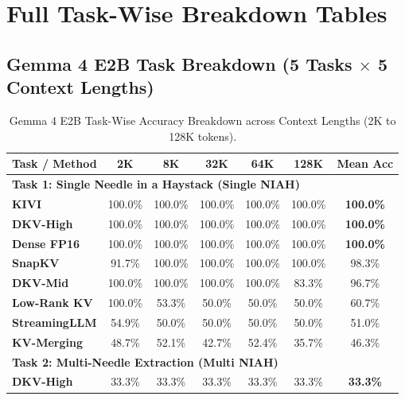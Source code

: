 \documentclass[10pt]{article}
\theoremstyle{definition}
\begin{document}
\clearpage
\section{Full Task-Wise Breakdown Tables}
\label{sec:app_tasks}

\subsection{Gemma 4 E2B Task Breakdown (5 Tasks \texorpdfstring{$\times$}{x} 5 Context Lengths)}

\begin{table}[h]
\vspace{6pt}
\centering
\small
\caption{Gemma 4 E2B Task-Wise Accuracy Breakdown across Context Lengths (2K to 128K tokens).}
\label{tab:e2b_task_breakdown}
\begin{tabular}{lcccccc}
\toprule
\textbf{Task / Method} & \textbf{2K} & \textbf{8K} & \textbf{32K} & \textbf{64K} & \textbf{128K} & \textbf{Mean Acc} \\
\midrule
\multicolumn{7}{l}{\textbf{Task 1: Single Needle in a Haystack (Single NIAH)}} \\
\textbf{KIVI} & 100.0\% & 100.0\% & 100.0\% & 100.0\% & 100.0\% & \textbf{100.0\%} \\
\textbf{DKV-High} & 100.0\% & 100.0\% & 100.0\% & 100.0\% & 100.0\% & \textbf{100.0\%} \\
\textbf{Dense FP16} & 100.0\% & 100.0\% & 100.0\% & 100.0\% & 100.0\% & \textbf{100.0\%} \\
\textbf{SnapKV} & 91.7\% & 100.0\% & 100.0\% & 100.0\% & 100.0\% & 98.3\% \\
\textbf{DKV-Mid} & 100.0\% & 100.0\% & 100.0\% & 100.0\% & 83.3\% & 96.7\% \\
\textbf{Low-Rank KV} & 100.0\% & 53.3\% & 50.0\% & 50.0\% & 50.0\% & 60.7\% \\
\textbf{StreamingLLM} & 54.9\% & 50.0\% & 50.0\% & 50.0\% & 50.0\% & 51.0\% \\
\textbf{KV-Merging} & 48.7\% & 52.1\% & 42.7\% & 52.4\% & 35.7\% & 46.3\% \\
\midrule
\multicolumn{7}{l}{\textbf{Task 2: Multi-Needle Extraction (Multi NIAH)}} \\
\textbf{DKV-High} & 33.3\% & 33.3\% & 33.3\% & 33.3\% & 33.3\% & \textbf{33.3\%} \\

\end{tabular}
\end{table}
\end{document}
